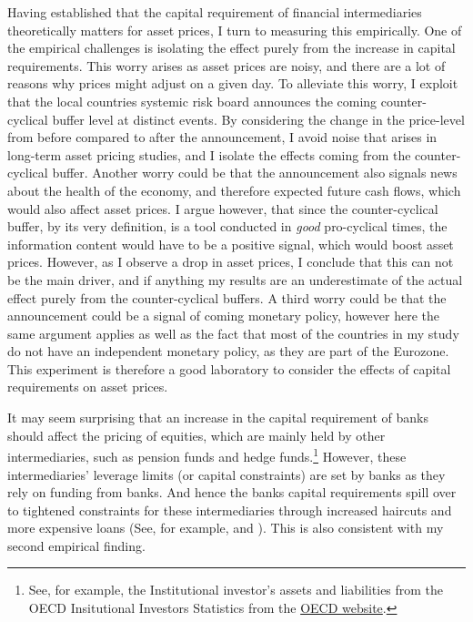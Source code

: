 \documentclass[11pt]{article}
\begin{document}
Having established that the capital requirement of financial intermediaries theoretically matters for asset prices, I turn to measuring this empirically. One of the empirical challenges is isolating the effect purely from the increase in capital requirements. This worry arises as asset prices are noisy, and there are a lot of reasons why prices might adjust on a given day. To alleviate this worry, I exploit that the local countries systemic risk board announces the coming counter-cyclical buffer level at distinct events. By considering the change in the price-level from before compared to after the announcement, I avoid noise that arises in long-term asset pricing studies, and I isolate the effects coming from the counter-cyclical buffer. Another worry could be that the announcement also signals news about the health of the economy, and therefore expected future cash flows, which would also affect asset prices. I argue however, that since the counter-cyclical buffer, by its very definition, is a tool conducted in \emph{good} pro-cyclical times, the information content would have to be a positive signal, which would boost asset prices. However, as I observe a drop in asset prices, I conclude that this can not be the main driver, and if anything my results are an underestimate of the actual effect purely from the counter-cyclical buffers. A third worry could be that the announcement could be a signal of coming monetary policy, however here the same argument applies as well as the fact that most of the countries in my study do not have an independent monetary policy, as they are part of the Eurozone. This experiment is therefore a good laboratory to consider the effects of capital requirements on asset prices.

It may seem surprising that an increase in the capital requirement of banks should affect the pricing of equities, which are mainly held by other intermediaries, such as pension funds and hedge funds.\footnote{See, for example, the Institutional investor's assets and liabilities from the OECD Insitutional Investors Statistics from the \href{https://stats.oecd.org/}{OECD website}.} However, these intermediaries' leverage limits (or capital constraints) are set by banks as they rely on funding from banks. And hence the banks capital requirements spill over to tightened constraints for these intermediaries through increased haircuts and more expensive loans (See, for example, \citealt{Brunnermeier2009} and \citealt{boyarchenko2018}). This is also consistent with my second empirical finding.
\end{document}
